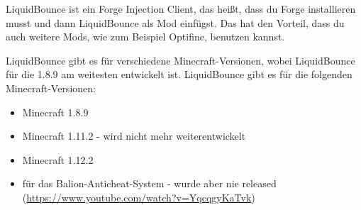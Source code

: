 LiquidBounce ist ein Forge Injection Client, das heißt, dass du Forge installieren musst und dann LiquidBounce als Mod einfügst. Das hat den Vorteil, dass du auch weitere Mods, wie zum Beispiel Optifine, benutzen kannst.

LiquidBounce gibt es für verschiedene Minecraft-Versionen, wobei LiquidBounce für die 1.8.9 am weitesten entwickelt ist. LiquidBounce gibt es für die folgenden Minecraft-Versionen:
\begin{itemize}
    \item Minecraft 1.8.9
    \item Minecraft 1.11.2 - wird nicht mehr weiterentwickelt
    \item Minecraft 1.12.2
    \item für das Balion-Anticheat-System - wurde aber nie released (\url{https://www.youtube.com/watch?v=YqcqgyKaTvk})
\end{itemize}